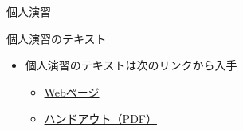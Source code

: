 \documentclass[a4paper,twoside,twocolumn]{beamer}
\begin{document}
\begin{frame}[label=sec-2]{個人演習}
\begin{block}{個人演習のテキスト}
\begin{itemize}
\item 個人演習のテキストは次のリンクから入手
\begin{itemize}
\item \href{https://github.com/ychubachi/github_practice/blob/master/github_practice-person_handout.org}{Webページ}
\item \href{https://github.com/ychubachi/github_practice/raw/master/github_practice-person_handout.pdf}{ハンドアウト（PDF）}
\end{itemize}
\end{itemize}
\end{block}
\end{frame}
\end{document}
